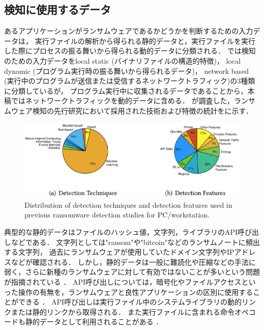 \subsection{検知に使用するデータ}
あるアプリケーションがランサムウェアであるかどうかを判断するための入力データは，
実行ファイルの解析から得られる静的データと，実行ファイルを実行した際にプロセスの振る舞いから得られる動的データに分類される．
\cite{berrueta2019survey}では検知のための入力データをlocal static (バイナリファイルの構造的特徴)，
local dynamic (プログラム実行時の振る舞いから得られるデータ)，
network based (実行中のプログラムが送信または受信するネットワークトラフィック)の3種類に分類しているが，
プログラム実行中に収集されるデータであることから，本稿ではネットワークトラフィックを動的データに含める．
\cite{Evolution-Ransomware}が調査した，ランサムウェア検知の先行研究において採用された技術および特徴の統計をに示す．
\begin{figure}[t]
  \begin{center}
    \includegraphics[width=\columnwidth]{doc/img/detection_overview.eps}
  \end{center}
  \caption{Distribution of detection techniques and detection features used in previous ransomware detection studies for PC/workstation. \cite{Evolution-Ransomware}}
  \label{fig:detection-overview}
\end{figure}


典型的な静的データはファイルのハッシュ値，文字列，ライブラリのAPI呼び出しなどである．
文字列としては"ransom"や"bitcoin"などのランサムノートに頻出する文字列，
過去にランサムウェアが使用していたドメイン文字列やIPアドレスなどが確認される\cite{berrueta2019survey}．
しかし，静的データは一般に難読化や圧縮などの手法に弱く，さらに新種のランサムウェアに対して有効ではないことが多いという問題が指摘されている \cite{mitigation-modern}．
API呼び出しについては，暗号化やファイルアクセスといった操作の有無を，ランサムウェアと良性アプリケーションの区別に使用することができる \cite{Evolution-Ransomware}．
API呼び出しは実行ファイル中のシステムライブラリの動的リンクまたは静的リンクから取得される．
また実行ファイルに含まれる命令オペコードも静的データとして利用されることがある \cite{baldwin2018leveraging}．

